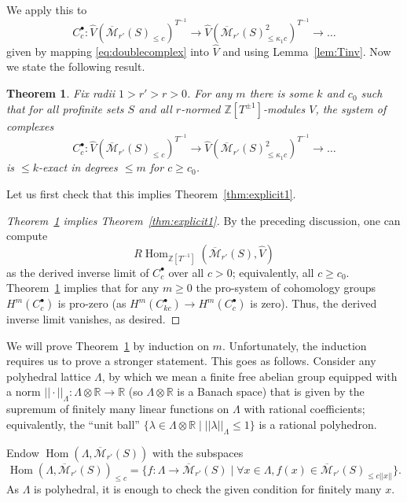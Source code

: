 \documentclass[11pt]{amsbook}
\DeclareMathOperator{\Hom}{Hom}
\renewcommand*{\hat}{\widehat}
\numberwithin{equation}{section}
\newtheorem{theorem}{Theorem}
\numberwithin{theorem}{section}
\theoremstyle{definition}
\begin{document}
We apply this to
\[
C_c^\bullet: \widehat{V}(\overline{\mathcal M}_{r'}(S)_{\leq c})^{T^{-1}}\to \widehat{V}(\overline{\mathcal M}_{r'}(S)_{\leq \kappa_1c}^2)^{T^{-1}}\to \ldots
\]
given by mapping \eqref{eq:doublecomplex} into $\hat{V}$ and using Lemma~\ref{lem:Tinv}. Now we state the following result.

\begin{theorem}\label{thm:explicit2} Fix radii $1>r'>r>0$. For any $m$ there is some $k$ and $c_0$ such that for all profinite sets $S$ and all $r$-normed $\mathbb Z[T^{\pm 1}]$-modules $V$, the system of complexes
\[
C_c^\bullet: \widehat{V}(\overline{\mathcal M}_{r'}(S)_{\leq c})^{T^{-1}}\to \widehat{V}(\overline{\mathcal M}_{r'}(S)_{\leq \kappa_1c}^2)^{T^{-1}}\to \ldots
\]
is $\leq k$-exact in degrees $\leq m$ for $c\geq c_0$.
\end{theorem}

Let us first check that this implies Theorem~\ref{thm:explicit1}.

\begin{proof}[Theorem~\ref{thm:explicit2} implies Theorem~\ref{thm:explicit1}] By the preceding discussion, one can compute
\[
R\Hom_{\mathbb Z[T^{-1}]}(\overline{\mathcal M}_{r'}(S),\widehat{V})
\]
as the derived inverse limit of $C_c^\bullet$ over all $c>0$; equivalently, all $c\geq c_0$. Theorem~\ref{thm:explicit2} implies that for any $m\geq 0$ the pro-system of cohomology groups $H^m(C_c^\bullet)$ is pro-zero (as $H^m(C_{kc}^\bullet)\to H^m(C_c^\bullet)$ is zero). Thus, the derived inverse limit vanishes, as desired.
\end{proof}

We will prove Theorem~\ref{thm:explicit2} by induction on $m$. Unfortunately, the induction requires us to prove a stronger statement. This goes as follows. Consider any polyhedral lattice $\Lambda$, by which we mean a finite free abelian group equipped with a norm $||\cdot||_\Lambda: \Lambda\otimes \mathbb R\to \mathbb R$ (so $\Lambda\otimes \mathbb R$ is a Banach space) that is given by the supremum of finitely many linear functions on $\Lambda$ with rational coefficients; equivalently, the ``unit ball'' $\{\lambda\in \Lambda\otimes \mathbb R\mid ||\lambda||_\Lambda\leq 1\}$ is a rational polyhedron.

Endow $\Hom(\Lambda,\overline{\mathcal M}_{r'}(S))$ with the subspaces
\[
\Hom(\Lambda,\overline{\mathcal M}_{r'}(S))_{\leq c} = \{f: \Lambda\to \overline{\mathcal M}_{r'}(S)\mid \forall x\in \Lambda, f(x)\in \overline{\mathcal M}_{r'}(S)_{\leq c||x||}\}.
\]
As $\Lambda$ is polyhedral, it is enough to check the given condition for finitely many $x$.
\end{document}
